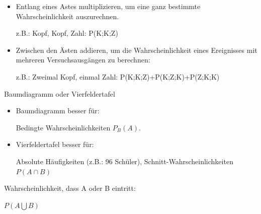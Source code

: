 \begin{antwort}\normalsize\begin{itemize}
		\item Entlang eines Astes multiplizieren, um eine ganz bestimmte Wahrscheinlichkeit auszurechnen.
				
		z.B.: Kopf, Kopf, Zahl: P(K;K;Z)
		\item Zwischen den Ästen addieren, um die Wahrscheinlichkeit eines Ereignisses mit mehreren Versuchsausgängen zu berechnen:
		
		z.B.: Zweimal Kopf, einmal Zahl: P(K;K;Z)+P(K;Z;K)+P(Z;K;K)
	\end{itemize}\end{antwort}
\begin{frage}Baumdiagramm oder Vierfeldertafel\end{frage}
\begin{antwort}\begin{itemize}
		\item Baumdiagramm besser für:
		
		Bedingte Wahrscheinlichkeiten $P_B(A)$.
		
		\item Vierfeldertafel besser für:
		
		Absolute Häufigkeiten (z.B.: 96 Schüler), Schnitt-Wahrscheinlichkeiten $P(A\cap B)$
	\end{itemize}\end{antwort}
\begin{frage}Wahrscheinlichkeit, dass A oder B eintritt: 
	
	$P(A\bigcup B)$\end{frage}
